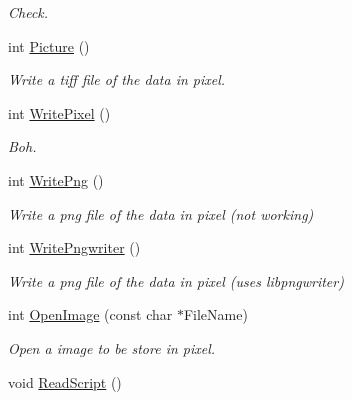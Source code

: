 \begin{DoxyCompactItemize}
\begin{DoxyCompactList}\small\item\em Check. \end{DoxyCompactList}\item 
int \hyperlink{classDraw_a45ed15a0527d5ba75107645dc8467078}{Picture} ()\hypertarget{classDraw_a45ed15a0527d5ba75107645dc8467078}{}\label{classDraw_a45ed15a0527d5ba75107645dc8467078}

\begin{DoxyCompactList}\small\item\em Write a tiff file of the data in pixel. \end{DoxyCompactList}\item 
int \hyperlink{classDraw_a289d8cd3100d77331ac7879eedcfcad0}{Write\+Pixel} ()\hypertarget{classDraw_a289d8cd3100d77331ac7879eedcfcad0}{}\label{classDraw_a289d8cd3100d77331ac7879eedcfcad0}

\begin{DoxyCompactList}\small\item\em Boh. \end{DoxyCompactList}\item 
int \hyperlink{classDraw_a0b5ba668037c62f126f6d480048f9087}{Write\+Png} ()\hypertarget{classDraw_a0b5ba668037c62f126f6d480048f9087}{}\label{classDraw_a0b5ba668037c62f126f6d480048f9087}

\begin{DoxyCompactList}\small\item\em Write a png file of the data in pixel (not working) \end{DoxyCompactList}\item 
int \hyperlink{classDraw_a46f9540fd46154cbfd9669ac414dbe2a}{Write\+Pngwriter} ()\hypertarget{classDraw_a46f9540fd46154cbfd9669ac414dbe2a}{}\label{classDraw_a46f9540fd46154cbfd9669ac414dbe2a}

\begin{DoxyCompactList}\small\item\em Write a png file of the data in pixel (uses libpngwriter) \end{DoxyCompactList}\item 
int \hyperlink{classDraw_a2e01e34ba6507a931ca7535f99c26347}{Open\+Image} (const char $\ast$File\+Name)\hypertarget{classDraw_a2e01e34ba6507a931ca7535f99c26347}{}\label{classDraw_a2e01e34ba6507a931ca7535f99c26347}

\begin{DoxyCompactList}\small\item\em Open a image to be store in pixel. \end{DoxyCompactList}\item 
void \hyperlink{classDraw_ad84f29894ee58a4e931cdbc41ba7a9d2}{Read\+Script} ()\hypertarget{classDraw_ad84f29894ee58a4e931cdbc41ba7a9d2}{}\label{classDraw_ad84f29894ee58a4e931cdbc41ba7a9d2}


\end{DoxyCompactItemize}
